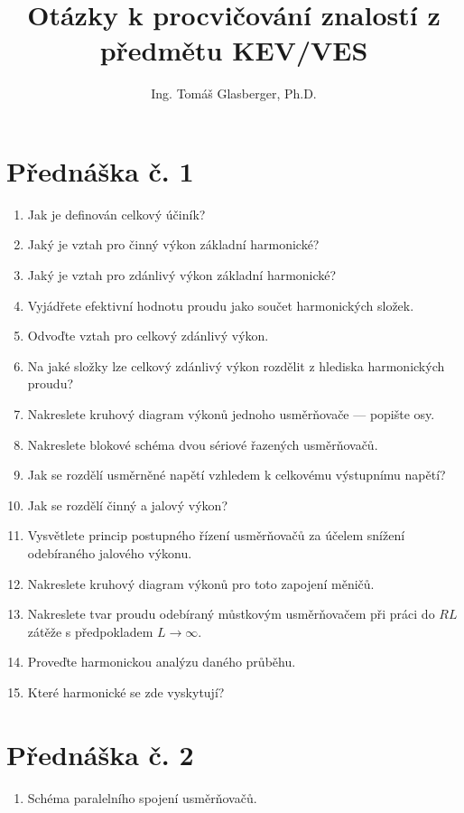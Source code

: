\documentclass[a4paper, 12pt]{article}
\title{Otázky k procvičování znalostí z předmětu KEV/VES}
\author{Ing. Tomáš Glasberger, Ph.D.}
\begin{document}
\maketitle

\section{Přednáška č. 1}
\begin{enumerate}
    \item Jak je definován celkový účiník?
    \item Jaký je vztah pro činný výkon základní harmonické?
    \item Jaký je vztah pro zdánlivý výkon základní harmonické?
    \item Vyjádřete efektivní hodnotu proudu jako součet harmonických složek.
    \item Odvoďte vztah pro celkový zdánlivý výkon.
    \item Na jaké složky lze celkový zdánlivý výkon rozdělit z hlediska harmonických proudu?
    \item Nakreslete kruhový diagram výkonů jednoho usměrňovače --- popište osy.
    \item Nakreslete blokové schéma dvou sériové řazených usměrňovačů. 
    \item Jak se rozdělí usměrněné napětí vzhledem k celkovému výstupnímu napětí?
    \item Jak se rozdělí činný a jalový výkon?
    \item Vysvětlete princip postupného řízení usměrňovačů za účelem snížení
      odebíraného jalového výkonu.
    \item Nakreslete kruhový diagram výkonů pro toto zapojení měničů.
    \item Nakreslete tvar proudu odebíraný můstkovým usměrňovačem při práci do
        $RL$ zátěže s předpokladem $L\rightarrow \infty $.
    \item Proveďte harmonickou analýzu daného průběhu. 
    \item Které harmonické se zde
        vyskytují?
\end{enumerate}

\section{Přednáška č. 2}
\begin{enumerate}
  \item Schéma paralelního spojení usměrňovačů.
  \end{enumerate}
\end{document}
